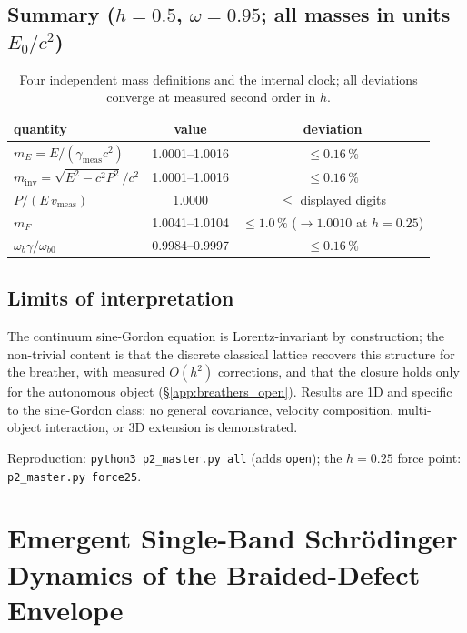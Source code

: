 \documentclass[11pt,a4paper]{article}
\theoremstyle{plain}
\theoremstyle{remark}
\begin{document}
\subsection{Summary ($h = 0.5$, $\omega = 0.95$; all masses in units $E_0/c^2$)}

\begin{table}[htbp]
\centering\small
\begin{tabular}{lcc}
\toprule
quantity & value & deviation \\
\midrule
$m_E = E/(\gamma_{\text{meas}} c^2)$ & 1.0001--1.0016 & $\le 0.16\,\%$ \\
$m_{\text{inv}} = \sqrt{E^2 - c^2P^2}/c^2$ & 1.0001--1.0016 & $\le 0.16\,\%$ \\
$P/(E\,v_{\text{meas}})$ & 1.0000 & $\le$ displayed digits \\
$m_F$ & 1.0041--1.0104 & $\le 1.0\,\%$ ($\to 1.0010$ at $h = 0.25$) \\
$\omega_b\gamma/\omega_{b0}$ & 0.9984--0.9997 & $\le 0.16\,\%$ \\
\bottomrule
\end{tabular}
\caption{Four independent mass definitions and the internal clock; all deviations converge at measured second order in $h$.}
\label{tab:breather_summary}
\end{table}

\subsection{Limits of interpretation}
The continuum sine-Gordon equation is Lorentz-invariant by construction; the non-trivial content is that the discrete classical lattice recovers this structure for the breather, with measured $O(h^2)$ corrections, and that the closure holds only for the autonomous object (\S\ref{app:breathers_open}). Results are 1D and specific to the sine-Gordon class; no general covariance, velocity composition, multi-object interaction, or 3D extension is demonstrated.

Reproduction: \texttt{python3 p2\_master.py all} (adds \texttt{open}); the $h = 0.25$ force point: \texttt{p2\_master.py force25}.

\section{Emergent Single-Band Schr\"odinger Dynamics of the Braided-Defect Envelope}
\label{app:schrodinger}
\end{document}
